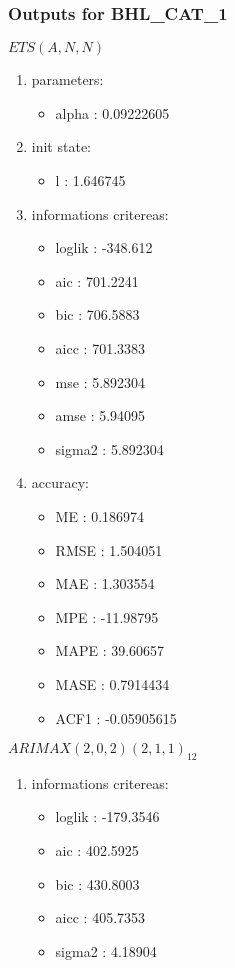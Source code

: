 \documentclass[10pt,a4paper]{article}\usepackage[]{graphicx}\usepackage[]{color}
\newcommand{\AaA}{\_}
\begin{document}
\subsubsection{Outputs for BHL\AaA CAT\AaA 1}
\begin{multicols}{2}


$ ETS(A,N,N) $
\begin{enumerate}
\item parameters:
\begin{itemize}
\item  alpha :  0.09222605 
\end{itemize}
\item init state:
\begin{itemize}
\item  l :  1.646745 
\end{itemize}
\item informations critereas:
\begin{itemize}
\item  loglik :  -348.612 
\item  aic :  701.2241 
\item  bic :  706.5883 
\item  aicc :  701.3383 
\item  mse :  5.892304 
\item  amse :  5.94095 
\item  sigma2 :  5.892304 
\end{itemize}
\item accuracy:
\begin{itemize}
\item  ME :  0.186974 
\item  RMSE :  1.504051 
\item  MAE :  1.303554 
\item  MPE :  -11.98795 
\item  MAPE :  39.60657 
\item  MASE :  0.7914434 
\item  ACF1 :  -0.05905615 
\end{itemize}
\end{enumerate}

\columnbreak


 $ARIMAX(2,0,2)(2,1,1)_{12}$ 
\begin{enumerate}
\item informations critereas:
\begin{itemize}
\item  loglik :  -179.3546 
\item  aic :  402.5925 
\item  bic :  430.8003 
\item  aicc :  405.7353 
\item  sigma2 :  4.18904 
\end{itemize}


\end{enumerate}
\end{multicols}
\end{document}
